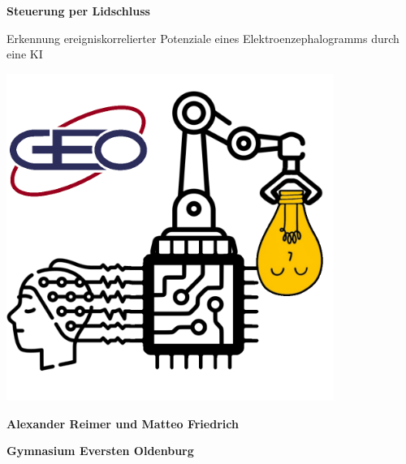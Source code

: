 \documentclass[11pt]{scrartcl}
\begin{document}


	\newcommand{\sig}{\textrm{sig}}
	\newcommand{\netin}{\textrm{net}}

	\newcommand{\threesub}[1]{
		\vspace{1.5ex}
		\noindent {\textbf{#1}}
		\vspace{0.5ex}
	}

	\newcommand{\form}[1]{#1}

	\newcommand{\fig}[1]{\centering #1}

	\newcommand{\filepath}[1]{\texttt{#1}}
	\newcommand{\cmd}[1]{\texttt{#1}}

	\newcommand{\ownurl}[1]{\texttt{#1}}

	\newcommand{\eng}[1]{\textit{#1}}
	\newcommand{\feng}[1]{{#1}}
	\renewcommand*{\arraystretch}{1.2}


	\thispagestyle{empty}

	\vspace*{10mm}
	{
		\begin{center}
			\Huge \textbf{Steuerung per Lidschluss}

			Erkennung ereigniskorrelierter Potenziale eines Elektroenzephalogramms durch eine KI
			\vspace*{10mm}
		\end{center}


		\begin{center}
		
			\includegraphics[width=0.8\textwidth]{pictures/logo.png}
		
			\vspace{15mm}
		
			{\huge \textbf{Alexander Reimer und Matteo Friedrich}}
		
			\vspace{1em}
		
			{\LARGE \textbf{Gymnasium Eversten Oldenburg}}
		
			\vspace{2em}
		\end{center}
	}
\end{document}
